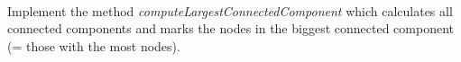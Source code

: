  \\
Implement the method \emph{computeLargestConnectedComponent} which calculates 
all connected components and marks the nodes in the biggest connected component 
(= those with the most nodes).